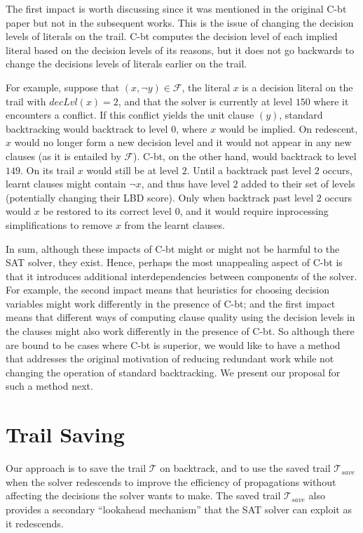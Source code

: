 \documentclass[runningheads]{llncs}
\newcommand{\sat}{SAT\xspace}
\newcommand{\trail}{\ensuremath{\mathcal{T}}}
\newcommand{\dlevel}[1]{\ensuremath{\mathit{decLvl}(#1)}}
\newcommand{\formula}{\ensuremath{\mathcal{F}}}
\newcommand{\cbt}{C-bt\xspace}
\newcommand{\trailsave}{\trail_{\mathit{save}}}
\begin{document}
The first impact is worth discussing since it was mentioned in the
original \cbt paper \cite{DBLP:conf/lpar/JiangZ13} but not in the
subsequent works. This is the issue of changing the decision levels of
literals on the trail. \cbt computes the decision level of each
implied literal based on the decision levels of its reasons, but it
does not go backwards to change the decisions levels of literals
earlier on the trail.

\begin{example}
    For example, suppose that $(x, \lnot y)\in \formula$, the literal $x$
    is a decision literal on the trail with $\dlevel{x}=2$, and that
    the solver is currently at level $150$ where it encounters a
    conflict. If this conflict yields the unit clause $(y)$, standard
    backtracking would backtrack to level $0$, where $x$ would be
    implied. On redescent, $x$ would no longer form a new decision
    level and it would not appear in any new clauses (as it is
    entailed by $\formula$). \cbt, on the other hand, would backtrack
    to level $149$. On its trail $x$ would still be at level
    $2$. Until a backtrack past level $2$ occurs, learnt clauses might
    contain $\lnot x$, and thus have level $2$ added to their set of
    levels (potentially changing their LBD score). Only when backtrack
    past level $2$ occurs would $x$ be restored to its correct level
    $0$, and it would require inprocessing simplifications to remove $x$
    from the learnt clauses.
\end{example}

In sum, although these impacts of \cbt might or might not be harmful
to the \sat solver, they exist. Hence, perhaps the most unappealing
aspect of \cbt is that it introduces additional interdependencies
between components of the solver. For example, the second impact means
that heuristics for choosing decision variables might work differently
in the presence of \cbt; and the first impact means that different
ways of computing clause quality using the decision levels in the
clauses might also work differently in the presence of \cbt. So
although there are bound to be cases where \cbt is superior, we would
like to have a method that addresses the original motivation of
reducing redundant work while not changing the operation of standard
backtracking. We present our proposal for such a method next.

\section{Trail Saving}
Our approach is to save the trail $\trail$ on backtrack, and to use
the saved trail $\trailsave$ when the solver redescends to improve the
efficiency of propagations without affecting the decisions the solver
wants to make. The saved trail $\trailsave$ also provides a secondary
``lookahead mechanism'' that the \sat solver can exploit as it
redescends.
\end{document}
